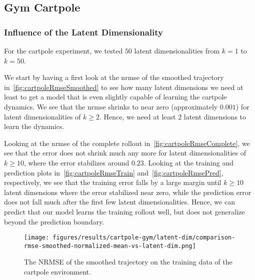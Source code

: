 	\subsection{Gym Cartpole} %
		\subsubsection{Influence of the Latent Dimensionality}
			\label{subsubsec:cartpoleLatents}

			For the cartpole experiment, we tested \(50\) latent dimensionalities from \( k = 1 \) to \( k = 50 \).

			We start by having a first look at the \ac{nrmse} of the smoothed trajectory in~\autoref{fig:cartpoleRmseSmoothed} to see how many latent dimensions we need at least to get a model that is even slightly capable of learning the cartpole dynamics. We see that the \ac{nrmse} shrinks to near zero (approximately \(0.001\)) for latent dimensionalities of \( k \geq 2 \). Hence, we need at least \(2\) latent dimensions to learn the dynamics.

			Looking at the \ac{nrmse} of the complete rollout in~\autoref{fig:cartpoleRmseComplete}, we see that the error does not shrink much any more for latent dimensionalities of \( k \geq 10 \), where the error stabilizes around \(0.23\). Looking at the training and prediction plots in~\autoref{fig:cartpoleRmseTrain} and~\autoref{fig:cartpoleRmsePred}, respectively, we see that the training error falls by a large margin until \( k \geq 10 \) latent dimensions where the error stabilized near zero, while the prediction error does not fall much after the first few latent dimensionalities. Hence, we can predict that our model learns the training rollout well, but does not generalize beyond the prediction boundary.

			\begin{figure}
				\centering
				\texttt{[image: figures/results/cartpole-gym/latent-dim/comparison-rmse-smoothed-normalized-mean-vs-latent-dim.png]}
				\caption[Error of the smoothed trajectory on the training data of the cartpole experiment]{The NRMSE of the smoothed trajectory on the training data of the cartpole environment.}
				\label{fig:cartpoleRmseSmoothed}
			\end{figure}

